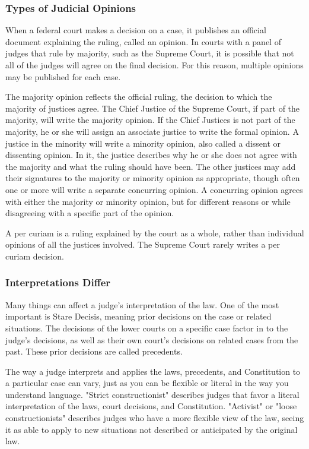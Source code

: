 
\subsubsection{Types of Judicial Opinions}

When a federal court makes a decision on a case, it publishes an official
document explaining the ruling, called an opinion. In courts with a panel of
judges that rule by majority, such as the Supreme Court, it is possible that not
all of the judges will agree on the final decision. For this reason, multiple
opinions may be published for each case.

The majority opinion reflects the official ruling, the decision to which the
majority of justices agree. The Chief Justice of the Supreme Court, if part of
the majority, will write the majority opinion. If the Chief Justices is not part
of the majority, he or she will assign an associate justice to write the formal
opinion. A justice in the minority will write a minority opinion, also called a
dissent or dissenting opinion. In it, the justice describes why he or she does
not agree with the majority and what the ruling should have been. The other
justices may add their signatures to the majority or minority opinion as
appropriate, though often one or more will write a separate concurring opinion.
A concurring opinion agrees with either the majority or minority opinion, but
for different reasons or while disagreeing with a specific part of the opinion.

A per curiam is a ruling explained by the court as a whole, rather than
individual opinions of all the justices involved. The Supreme Court rarely
writes a per curiam decision.

\subsubsection{Interpretations Differ}

Many things can affect a judge's interpretation of the law. One of the most
important is Stare Decisis, meaning prior decisions on the case or related
situations. The decisions of the lower courts on a specific case factor in to
the judge's decisions, as well as their own court's decisions on related cases
from the past. These prior decisions are called precedents.

The way a judge interprets and applies the laws, precedents, and Constitution to
a particular case can vary, just as you can be flexible or literal in the way
you understand language. "Strict constructionist" describes judges that favor a
literal interpretation of the laws, court decisions, and Constitution.
"Activist" or "loose constructionists" describes judges who have a more flexible
view of the law, seeing it as able to apply to new situations not described or
anticipated by the original law.

